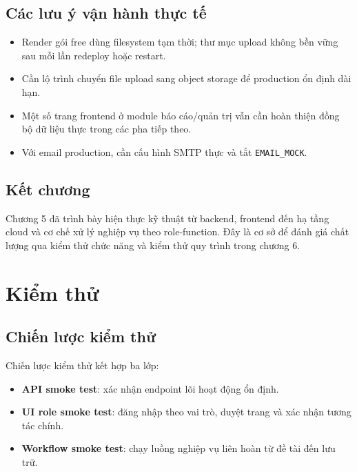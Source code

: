 \documentclass[12pt,a4paper]{report}
\begin{document}
\section{Các lưu ý vận hành thực tế}
\begin{itemize}[leftmargin=1.2cm]
\item Render gói free dùng filesystem tạm thời; thư mục upload không bền vững sau mỗi lần redeploy hoặc restart.
\item Cần lộ trình chuyển file upload sang object storage để production ổn định dài hạn.
\item Một số trang frontend ở module báo cáo/quản trị vẫn cần hoàn thiện đồng bộ dữ liệu thực trong các pha tiếp theo.
\item Với email production, cần cấu hình SMTP thực và tắt \texttt{EMAIL\_MOCK}.
\end{itemize}

\section{Kết chương}
Chương 5 đã trình bày hiện thực kỹ thuật từ backend, frontend đến hạ tầng cloud và cơ chế xử lý nghiệp vụ theo role-function. Đây là cơ sở để đánh giá chất lượng qua kiểm thử chức năng và kiểm thử quy trình trong chương 6.

\chapter{Kiểm thử}

\section{Chiến lược kiểm thử}
Chiến lược kiểm thử kết hợp ba lớp:
\begin{itemize}[leftmargin=1.2cm]
\item \textbf{API smoke test}: xác nhận endpoint lõi hoạt động ổn định.
\item \textbf{UI role smoke test}: đăng nhập theo vai trò, duyệt trang và xác nhận tương tác chính.
\item \textbf{Workflow smoke test}: chạy luồng nghiệp vụ liên hoàn từ đề tài đến lưu trữ.
\end{itemize}
\end{document}
